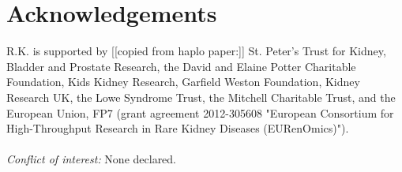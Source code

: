 
\section*{Acknowledgements}

R.K. is supported by [[copied from haplo paper:]] St. Peter's Trust for Kidney, Bladder and Prostate Research, the David and Elaine Potter Charitable Foundation, Kids Kidney Research, Garfield Weston Foundation, Kidney Research UK, the Lowe Syndrome Trust, the Mitchell Charitable Trust, and the European Union, FP7 (grant agreement 2012-305608 "European Consortium for High-Throughput Research in Rare Kidney Diseases (EURenOmics)").\\\
\\
\noindent
\textit{Conflict of interest:} None declared.



